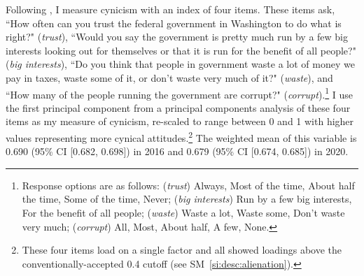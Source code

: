 \documentclass[12pt]{article}
\begin{document}
Following \textcite{miller1974political}, I measure cynicism with an index of four items. These items ask, ``How often can you trust the federal government in Washington to do what is right?" (\textit{trust}), ``Would you say the government is pretty much run by a few big interests looking out for themselves or that it is run for the benefit of all people?" (\textit{big interests}), ``Do you think that people in government waste a lot of money we pay in taxes, waste some of it, or don't waste very much of it?" (\textit{waste}), and ``How many of the people running the government are corrupt?" (\textit{corrupt}).\footnote{Response options are as follows: (\textit{trust}) Always, Most of the time, About half the time, Some of the time, Never; (\textit{big interests}) Run by a few big interests, For the benefit of all people; (\textit{waste}) Waste a lot, Waste some, Don't waste very much; (\textit{corrupt}) All, Most, About half, A few, None.} I use the first principal component from a principal components analysis of these four items as my measure of cynicism, re-scaled to range between 0 and 1 with higher values representing more cynical attitudes.\footnote{These four items load on a single factor and all showed loadings above the conventionally-accepted 0.4 cutoff (see SM~\ref{si:desc:alienation}).} The weighted mean of this variable is 0.690 (95\% CI [0.682, 0.698]) in 2016 and 0.679 (95\% CI [0.674, 0.685]) in 2020. 
\end{document}
